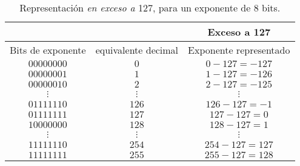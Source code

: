 \begin{table}
\centering
\begin{tabular}{ccc}
&&Exceso a 127\\
\hline
Bits de exponente&equivalente decimal&Exponente representado\\
\hline      
$00000000$&$0$&$0-127=-127$\\
\hline
$00000001$&$1$&$1-127=-126$\\
\hline
$00000010$&$2$&$2-127=-125$\\
\hline
$\vdots$&$\vdots$&$\vdots$\\
\hline
$01111110$&$126$&$126-127=-1$\\
\hline
$01111111$&$127$&$127-127=0$\\
\hline
$10000000$&$128$&$128-127=1$\\
\hline
$\vdots$&$\vdots$&$\vdots$\\
\hline
$11111110$&$254$&$254-127=127$\\
\hline
$11111111$&$255$&$255-127=128$\\
\hline
\end{tabular}
\caption{Representación \emph{en exceso a} 127, para un exponente de 8 bits.}
\label{tabex}
\end{table}

